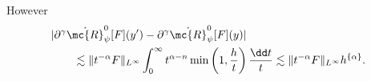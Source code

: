 However
\[
\begin{aligned}[t]
   & |\partial^\gamma\dot{\mc{R}}^0_\psi[F](y') -
  \partial^\gamma\dot{\mc{R}}^0_\psi[F](y)|       \\
   & \qquad\lesssim
  \|t^{-\alpha}F\|_{L^\infty}
  \int_0^\infty
  t^{\alpha-n}
  \min\left(1,\frac{h}{t}\right)
  \frac{\dd t}{t}
  \lesssim
  \|t^{-\alpha}F\|_{L^\infty}h^{\{\alpha\}}.
\end{aligned}
\]

